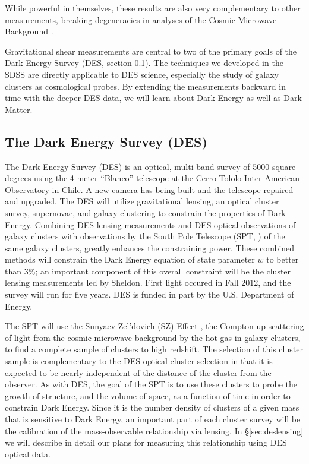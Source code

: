 \documentclass[12pt]{article}
\newcommand{\commissdate}{Fall 2012}
\begin{document}
While powerful in themselves, these results are also very complementary to
other measurements, breaking degeneracies in analyses of the Cosmic Microwave
Background \cite{KomatsuWMAPCosmo09}. 

Gravitational shear measurements are central to two of the primary goals of the
Dark Energy Survey (DES, section \ref{sec:des}).  The techniques we developed
in the SDSS are directly applicable to DES science, especially the study of
galaxy clusters as cosmological probes.  By extending the measurements backward
in time with the deeper DES data, we will learn about Dark Energy as well as
Dark Matter.


\subsection{The Dark Energy Survey (DES)} \label{sec:des}

The Dark Energy Survey (DES) is an optical, multi-band survey of 5000 square
degrees using the 4-meter ``Blanco'' telescope at the Cerro Tololo
Inter-American Observatory in Chile. A new camera has being built and the
telescope repaired and upgraded.  The DES will utilize gravitational lensing,
an optical cluster survey, supernovae, and galaxy clustering to constrain the
properties of Dark Energy.  Combining DES lensing measurements and DES optical
observations of galaxy clusters with observations by the South Pole Telescope
(SPT, \cite{SPT04}) of the same galaxy clusters, greatly enhances the
constraining power.  These combined methods will constrain the Dark Energy
equation of state parameter $w$ to better than 3\%; an important component of
this overall constraint will be the cluster lensing measurements led by
Sheldon.  First light occured in \commissdate, and the survey will run for five
years.  DES is funded in part by the U.S. Department of Energy. 


The SPT will use the Sunyaev-Zel'dovich (SZ) Effect \cite{Birkinshaw99}, the
Compton up-scattering of light from the cosmic microwave background by the hot
gas in galaxy clusters, to find a complete sample of clusters to high redshift.
The selection of this cluster sample is complementary to the DES optical
cluster selection in that it is expected to be nearly independent of the
distance of the cluster from the observer.  As with DES, the goal of the SPT is
to use these clusters to probe the growth of structure, and the volume of
space, as a function of time in order to constrain Dark Energy.  Since it is
the number density of clusters of a given mass that is sensitive to Dark
Energy, an important part of each cluster survey will be the calibration of the
mass-observable relationship via lensing.  In \S \ref{sec:deslensing} we will
describe in detail our plans for measuring this relationship using DES optical
data.
\end{document}
